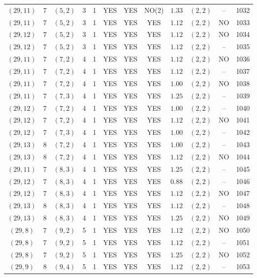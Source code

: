 \begin{longtable}{|c|c|c|c|c|c|c|c|c|c|c|c|}
$(29,11)$ & 7 & $(5,2)$ & 3 & 1 & YES & YES & NO(2) & $1.33$ & $(2,2)$ & -- & 1032\\
$(29,11)$ & 7 & $(5,2)$ & 3 & 1 & YES & YES & YES & $1.12$ & $(2,2)$ & NO & 1033\\
$(29,12)$ & 7 & $(5,2)$ & 3 & 1 & YES & YES & YES & $1.12$ & $(2,2)$ & NO & 1034\\
$(29,12)$ & 7 & $(5,2)$ & 3 & 1 & YES & YES & YES & $1.12$ & $(2,2)$ & -- & 1035\\
$(29,11)$ & 7 & $(7,2)$ & 4 & 1 & YES & YES & YES & $1.12$ & $(2,2)$ & NO & 1036\\
$(29,11)$ & 7 & $(7,2)$ & 4 & 1 & YES & YES & YES & $1.12$ & $(2,2)$ & -- & 1037\\
$(29,11)$ & 7 & $(7,2)$ & 4 & 1 & YES & YES & YES & $1.00$ & $(2,2)$ & NO & 1038\\
$(29,11)$ & 7 & $(7,3)$ & 4 & 1 & YES & YES & YES & $1.25$ & $(2,2)$ & -- & 1039\\
$(29,12)$ & 7 & $(7,2)$ & 4 & 1 & YES & YES & YES & $1.00$ & $(2,2)$ & -- & 1040\\
$(29,12)$ & 7 & $(7,2)$ & 4 & 1 & YES & YES & YES & $1.12$ & $(2,2)$ & NO & 1041\\
$(29,12)$ & 7 & $(7,3)$ & 4 & 1 & YES & YES & YES & $1.00$ & $(2,2)$ & -- & 1042\\
$(29,13)$ & 8 & $(7,2)$ & 4 & 1 & YES & YES & YES & $1.00$ & $(2,2)$ & -- & 1043\\
$(29,13)$ & 8 & $(7,2)$ & 4 & 1 & YES & YES & YES & $1.12$ & $(2,2)$ & NO & 1044\\
$(29,11)$ & 7 & $(8,3)$ & 4 & 1 & YES & YES & YES & $1.25$ & $(2,2)$ & -- & 1045\\
$(29,12)$ & 7 & $(8,3)$ & 4 & 1 & YES & YES & YES & $0.88$ & $(2,2)$ & -- & 1046\\
$(29,12)$ & 7 & $(8,3)$ & 4 & 1 & YES & YES & YES & $1.12$ & $(2,2)$ & NO & 1047\\
$(29,13)$ & 8 & $(8,3)$ & 4 & 1 & YES & YES & YES & $1.12$ & $(2,2)$ & -- & 1048\\
$(29,13)$ & 8 & $(8,3)$ & 4 & 1 & YES & YES & YES & $1.25$ & $(2,2)$ & NO & 1049\\
$(29,8)$ & 7 & $(9,2)$ & 5 & 1 & YES & YES & YES & $1.12$ & $(2,2)$ & NO & 1050\\
$(29,8)$ & 7 & $(9,2)$ & 5 & 1 & YES & YES & YES & $1.12$ & $(2,2)$ & -- & 1051\\
$(29,8)$ & 7 & $(9,2)$ & 5 & 1 & YES & YES & YES & $1.25$ & $(2,2)$ & NO & 1052\\
$(29,9)$ & 8 & $(9,4)$ & 5 & 1 & YES & YES & YES & $1.12$ & $(2,2)$ & -- & 1053\\

\end{longtable}
